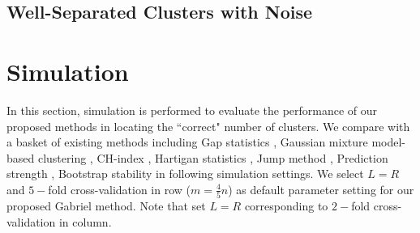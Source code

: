 \documentclass[11pt]{article}
\begin{document}
\subsection{Well-Separated Clusters with Noise}



\section{Simulation}

In this section, simulation is performed to evaluate the performance of our
proposed methods in locating the ``correct" number of clusters. We compare
with a basket of existing methods including Gap statistics
\citep{tibshirani2001estimating}, Gaussian mixture model-based clustering
\citep{fraley2002model}, CH-index \citep{calinski1974dendrite}, Hartigan
statistics \citep{hartigan1975clustering}, Jump method
\citep{sugar2003finding}, Prediction strength \citep{tibshirani2005cluster},
Bootstrap stability \citep{fang2012selection} in following simulation
settings. We select $L=R$ and $5-$fold cross-validation in row
($m=\frac{4}{5}n$) as default parameter setting for our proposed Gabriel
method. Note that set $L=R$ corresponding to $2-$fold cross-validation in
column.
\end{document}
